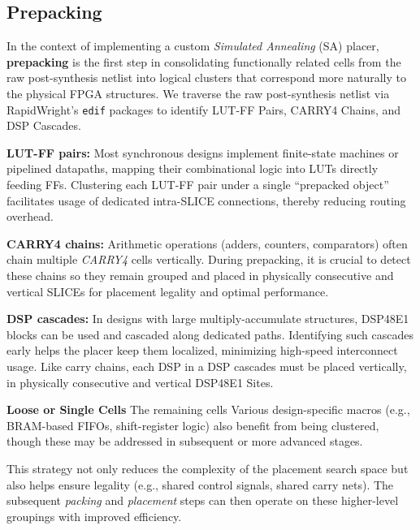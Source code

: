 \documentclass{article}
\begin{document}
    \begin{multicols}{2}

    \subsection{Prepacking}
        \label{subsec:prepacking}

        In the context of implementing a custom \emph{Simulated Annealing} (SA) placer, \textbf{prepacking} is the first step in consolidating functionally related cells from the raw post-synthesis netlist into logical clusters that correspond more naturally to the physical FPGA structures. 
        We traverse the raw post-synthesis netlist via RapidWright’s \texttt{edif} packages to identify LUT-FF Pairs, CARRY4 Chains, and DSP Cascades.

        \textbf{LUT-FF pairs:} \quad
            Most synchronous designs implement finite-state machines or pipelined datapaths, mapping their combinational logic into LUTs directly feeding FFs. 
            Clustering each LUT-FF pair under a single “prepacked object” facilitates usage of dedicated intra-SLICE connections, thereby reducing routing overhead.

        \textbf{CARRY4 chains:} \quad
            Arithmetic operations (adders, counters, comparators) often chain multiple \emph{CARRY4} cells vertically. 
            During prepacking, it is crucial to detect these chains so they remain grouped and placed in physically consecutive and vertical SLICEs for placement legality and optimal performance.

        \textbf{DSP cascades:} \quad
            In designs with large multiply-accumulate structures, DSP48E1 blocks can be used and cascaded along dedicated paths. 
            Identifying such cascades early helps the placer keep them localized, minimizing high-speed interconnect usage.
            Like carry chains, each DSP in a DSP cascades must be placed vertically, in physically consecutive and vertical DSP48E1 Sites.

        \textbf{Loose or Single Cells} \quad
            The remaining cells 
            Various design-specific macros (e.g., BRAM-based FIFOs, shift-register logic) also benefit from being clustered, though these may be addressed in subsequent or more advanced stages.

        This strategy not only reduces the complexity of the placement search space but also helps ensure legality (e.g., shared control signals, shared carry nets). 
        The subsequent \emph{packing} and \emph{placement} steps can then operate on these higher-level groupings with improved efficiency. 


\end{multicols}
\end{document}
